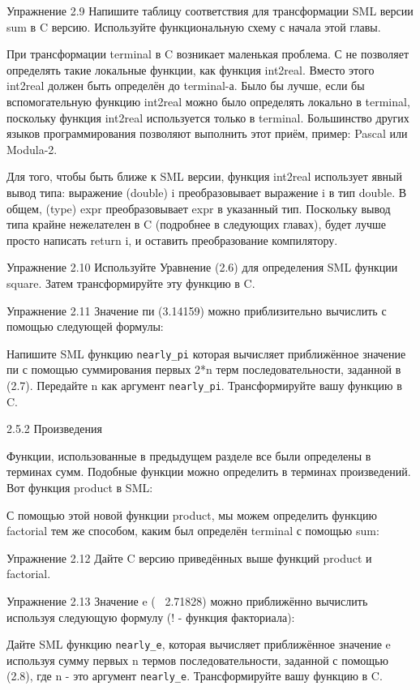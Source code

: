 Упражнение 2.9 Напишите таблицу соответствия для трансформации SML версии sum в C версию. Используйте функциональную схему с начала этой главы.

При трансформации terminal в C возникает маленькая проблема. С не позволяет определять такие локальные функции, как функция int2real. Вместо этого int2real должен быть определён до terminal-а. Было бы лучше, если бы вспомогательную функцию int2real можно было определять локально в terminal, поскольку функция int2real используется только в terminal. Большинство других языков программирования позволяют выполнить этот приём, пример: Pascal или Modula-2.

Для того, чтобы быть ближе к SML версии, функция int2real использует явный вывод типа: выражение (double) i преобразовывает выражение i в тип double. В общем, (type) expr преобразовывает expr в указанный тип. Поскольку вывод типа крайне нежелателен в C (подробнее в следующих главах), будет лучше просто написать return i, и оставить преобразование компилятору.

Упражнение 2.10 Используйте Уравнение (2.6) для определения SML функции square. Затем трансформируйте эту функцию в C.

Упражнение 2.11 Значение пи (3.14159) можно приблизительно вычислить с помощью следующей формулы:

Напишите SML функцию \lstinline|nearly_pi| которая вычисляет приближённое значение пи с помощью суммирования первых 2*n терм последовательности, заданной в (2.7). Передайте n как аргумент \lstinline|nearly_pi|. Трансформируйте вашу функцию в C.

2.5.2 Произведения

Функции, использованные в предыдущем разделе все были определены в терминах сумм. Подобные функции можно определить в терминах произведений. Вот функция product в SML:

С помощью этой новой функции product, мы можем определить функцию factorial тем же способом, каким был определён terminal с помощью sum:

Упражнение 2.12 Дайте C версию приведённых выше функций product и factorial.

Упражнение 2.13 Значение e (~ 2.71828) можно приближённо вычислить используя следующую формулу (! - функция факториала):

Дайте SML функцию \lstinline|nearly_e|, которая вычисляет приближённое значение e используя сумму первых n термов последовательности, заданной с помощью (2.8), где n - это аргумент \lstinline|nearly_e|. Трансформируйте вашу функцию в C.


